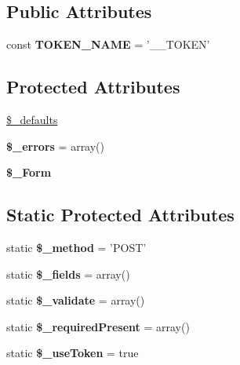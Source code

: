 \subsection*{Public Attributes}
\begin{DoxyCompactItemize}
\item 
\hypertarget{classForm_acef302707ccc3c31725199b3adfa912e}{
const {\bfseries TOKEN\_\-NAME} = '\_\-\_\-TOKEN'}
\label{classForm_acef302707ccc3c31725199b3adfa912e}

\end{DoxyCompactItemize}
\subsection*{Protected Attributes}
\begin{DoxyCompactItemize}
\item 
\hyperlink{classForm_a25f4ad782d570833cbd0320fd949651c}{\$\_\-defaults}
\item 
\hypertarget{classForm_a6588411906ebc9b77538fd35c66b6061}{
{\bfseries \$\_\-errors} = array()}
\label{classForm_a6588411906ebc9b77538fd35c66b6061}

\item 
\hypertarget{classForm_a99adb61969412070e68825ee27977a82}{
{\bfseries \$\_\-Form}}
\label{classForm_a99adb61969412070e68825ee27977a82}

\end{DoxyCompactItemize}
\subsection*{Static Protected Attributes}
\begin{DoxyCompactItemize}
\item 
\hypertarget{classForm_a2e440ec9c20bf3c37b2d88d8e2f5832d}{
static {\bfseries \$\_\-method} = 'POST'}
\label{classForm_a2e440ec9c20bf3c37b2d88d8e2f5832d}

\item 
\hypertarget{classForm_a2ae01dc28ade07ea33443d58e1f3ff35}{
static {\bfseries \$\_\-fields} = array()}
\label{classForm_a2ae01dc28ade07ea33443d58e1f3ff35}

\item 
\hypertarget{classForm_ae7b9bcff478aa176d7cbc6ad31cf0224}{
static {\bfseries \$\_\-validate} = array()}
\label{classForm_ae7b9bcff478aa176d7cbc6ad31cf0224}

\item 
\hypertarget{classForm_a10c62b840cbdcdab634fa121b935c03f}{
static {\bfseries \$\_\-requiredPresent} = array()}
\label{classForm_a10c62b840cbdcdab634fa121b935c03f}

\item 
\hypertarget{classForm_a12dfb7a3c2919d238e5c0b6993c56b9c}{
static {\bfseries \$\_\-useToken} = true}
\label{classForm_a12dfb7a3c2919d238e5c0b6993c56b9c}

\end{DoxyCompactItemize}



